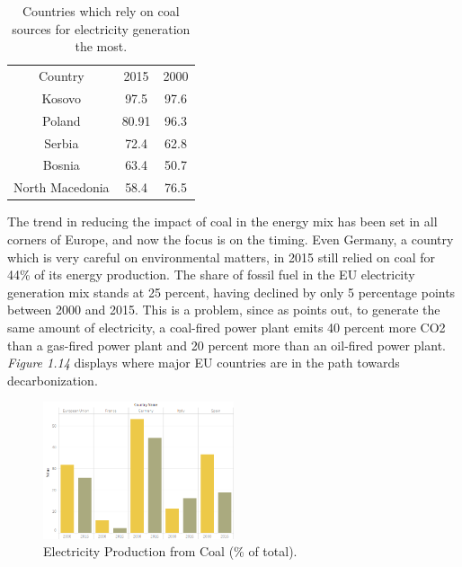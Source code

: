 \documentclass{book}
\begin{document}
\bigskip
\begin{table}[H]
\begin{center}
\begin{tabular}{|c|c|c|}
\hline
\rowcolor{lightgray} \multicolumn{3}{|c|}{Electricity Prod. from Coal (\% of total)}\\
\hline
Country & 2015 & 2000 \\
\hline
Kosovo & 97.5 & 97.6\\
Poland & 80.91 & 96.3 \\
Serbia & 72.4 & 62.8 \\
Bosnia & 63.4 & 50.7\\
North Macedonia & 58.4 & 76.5\\
\hline
\end{tabular}
\caption{Countries which rely on coal sources for electricity generation the most.}
\end{center}
\end{table}
\bigskip

The trend in reducing the impact of coal in the energy mix has been set in all corners of Europe, and now the focus is on the timing. Even Germany, a country which is very careful on environmental matters, in 2015 still relied on coal for 44\% of its energy production. The share of fossil fuel in the EU electricity generation mix stands at 25 percent, having declined by only 5 percentage points between 2000 and 2015. This is a problem, since as \cite{tagliapietra2017beyond} points out, to generate the same amount of electricity, a coal-fired power plant emits 40 percent more CO2 than a gas-fired power plant and 20 percent more than an oil-fired power plant. \textit{Figure 1.14} displays where major EU countries are in the path towards decarbonization.

\bigskip
\begin{figure}[H]
\begin{center}
\captionsetup{justification=centering}
\includegraphics[width=0.5\textwidth]{Images/coal.png}
\caption{Electricity Production from Coal (\% of total). }
\end{center}
\end{figure}
\bigskip
\end{document}
